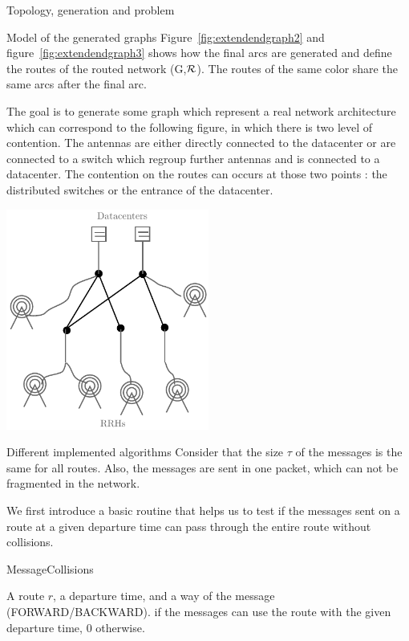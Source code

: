 \documentclass[10pt]{article}
\begin{document}
\begin{section}{Topology, generation and problem}
\begin{subsection}{Model of the generated graphs}
Figure~\ref{fig:extendendgraph2} and figure~\ref{fig:extendendgraph3} shows how the final arcs are generated and define the routes of the routed network (G,$\cal{R}$). The routes of the same color share the same arcs after the final arc.


  The goal is to generate some graph which represent a real network architecture which can correspond to the following figure, in which there is two level of contention. The antennas are either directly connected to the datacenter or are connected to a switch which regroup further antennas and is connected to a datacenter. The contention on the routes can occurs at those two points : the distributed switches or the entrance of the datacenter.

\begin{center}

\includegraphics[width=0.5\textwidth]{example23}
\end{center}

  
  \end{subsection}
  
  \begin{subsection}{Different implemented algorithms}
  Consider that the size $\tau$ of the messages is the same for all routes. Also, the messages are sent in one packet, which can not be fragmented in the network.
  
  We first introduce a basic routine that helps us to test if the messages sent on a route at a given departure time can pass through the entire route without collisions.
  
    	\begin{algorithm}[H]
 	\caption{MessageCollisions}
 	\begin{algorithmic}
 	\REQUIRE A route $r$, a departure time, and a way of the message (FORWARD/BACKWARD).
	 if the messages can use the route with the given departure time, $0$ otherwise.


\end{algorithmic}
\end{algorithm}
\end{subsection}
\end{section}
\end{document}
